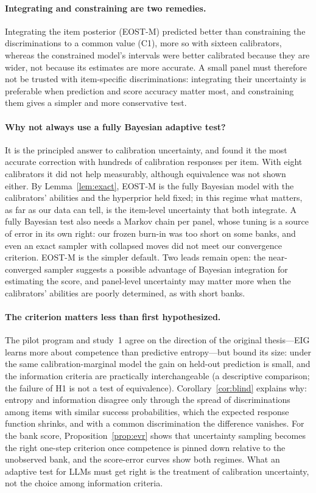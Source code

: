 \paragraph{Integrating and constraining are two remedies.} Integrating the item posterior
(EOST-M) predicted better than constraining the discriminations to a common value (C1), more
so with sixteen calibrators, whereas the constrained model's intervals were better calibrated
because they are wider, not because its estimates are more accurate. A small panel must
therefore not be trusted with item-specific discriminations: integrating their uncertainty is
preferable when prediction and score accuracy matter most, and constraining them gives a
simpler and more conservative test.

\paragraph{Why not always use a fully Bayesian adaptive test?} It is the principled answer
to calibration uncertainty, and \citet{fink2025accounting} found it the most accurate
correction with hundreds of calibration responses per item. With eight calibrators it did not
help measurably, although equivalence was not shown either. By Lemma~\ref{lem:exact}, EOST-M
is the fully Bayesian model with the calibrators' abilities and the hyperprior held fixed; in
this regime what matters, as far as our data can tell, is the item-level uncertainty that
both integrate. A fully Bayesian test also needs a Markov chain per panel, whose tuning is a
source of error in its own right: our frozen burn-in was too short on some banks, and even an
exact sampler with collapsed moves did not meet our convergence criterion. EOST-M is the
simpler default. Two leads remain open: the near-converged sampler suggests a possible
advantage of Bayesian integration for estimating the score, and panel-level uncertainty may
matter more when the calibrators' abilities are poorly determined, as with short banks.

\paragraph{The criterion matters less than first hypothesized.} The pilot program and
study~1 agree on the direction of the original thesis---EIG learns more about competence than
predictive entropy---but bound its size: under the same calibration-marginal model the gain
on held-out prediction is small, and the information criteria are practically
interchangeable (a descriptive comparison; the failure of H1 is not a test of equivalence).
Corollary~\ref{cor:blind} explains why: entropy and information disagree only through the
spread of discriminations among items with similar success probabilities, which the expected
response function shrinks, and with a common discrimination the difference vanishes. For the
bank score, Proposition~\ref{prop:evr} shows that uncertainty sampling becomes the right
one-step criterion once competence is pinned down relative to the unobserved bank, and the
score-error curves show both regimes. What an adaptive test for LLMs must get right is the
treatment of calibration uncertainty, not the choice among information criteria.

